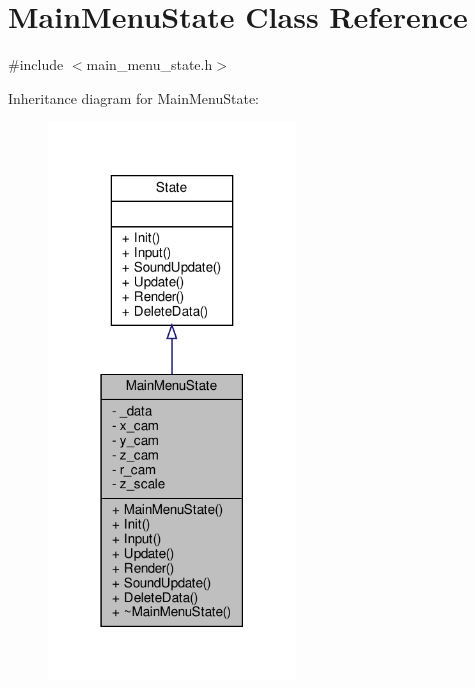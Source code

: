 \hypertarget{classMainMenuState}{}\section{Main\+Menu\+State Class Reference}
\label{classMainMenuState}


{\ttfamily \#include $<$main\+\_\+menu\+\_\+state.\+h$>$}



Inheritance diagram for Main\+Menu\+State\+:
\nopagebreak
\begin{figure}[H]
\begin{center}
\leavevmode
\includegraphics[width=186pt]{classMainMenuState__inherit__graph}
\end{center}
\end{figure}


